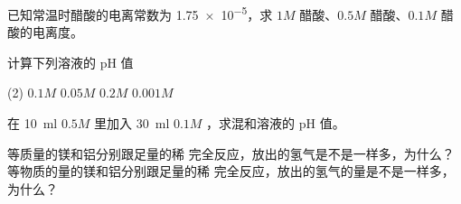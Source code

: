 \begin{Exercise}
\begin{question}
  \item 已知常温时醋酸的电离常数为 \num{1.75e-5}，求 $1M$ 醋酸、$0.5M$ 醋酸、$0.1M$ 醋酸的电离度。
  \item 计算下列溶液的 pH 值
  \begin{tasks}(2)
    \task $0.1M$ 
    \task $0.05M$ 
    \task $0.2M$ 
    \task $0.001M$ 
  \end{tasks}
  \item 在 \qty{10}{ml} $0.5M$  里加入 \qty{30}{ml} $0.1M$ ，求混和溶液的 pH 值。
  \item 等质量的镁和铝分别跟足量的稀  完全反应，放出的氢气是不是一样多，为什么？等物质的量的镁和铝分别跟足量的稀  完全反应，放出的氢气的量是不是一样多，为什么？
\end{question}
\end{Exercise}